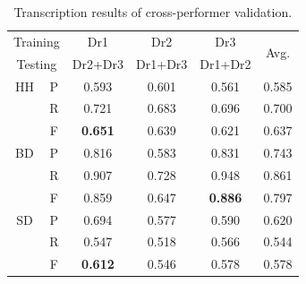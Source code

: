 \documentclass{article}
\begin{document}
\begin{table}[h]
\begin{center}
\begin{tabular}{|c|c|c|c|c|c|}
\hline
\multicolumn{2}{|c|}{Training} & Dr1            & Dr2     & Dr3            & \multirow{2}{*}{Avg.} \\ \cline{1-5}
\multicolumn{2}{|c|}{Testing}  & Dr2+Dr3        & Dr1+Dr3 & Dr1+Dr2        &                       \\ \hline
HH             & P             & 0.593          & 0.601   & 0.561          & 0.585                 \\ \hline
               & R             & 0.721          & 0.683   & 0.696          & 0.700                 \\ \hline
               & F             & \textbf{0.651} & 0.639   & 0.621          & 0.637                 \\ \hline
BD             & P             & 0.816          & 0.583   & 0.831          & 0.743                 \\ \hline
               & R             & 0.907          & 0.728   & 0.948          & 0.861                 \\ \hline
               & F             & 0.859          & 0.647   & \textbf{0.886} & 0.797                 \\ \hline
SD             & P             & 0.694          & 0.577   & 0.590          & 0.620                 \\ \hline
               & R             & 0.547          & 0.518   & 0.566          & 0.544                 \\ \hline
               & F             & \textbf{0.612} & 0.546   & 0.578          & 0.578                 \\ \hline
\end{tabular}
 \caption{Transcription results of cross-performer validation.}
 \label{tab:crossResults}
 \end{center}
\end{table}
\end{document}
